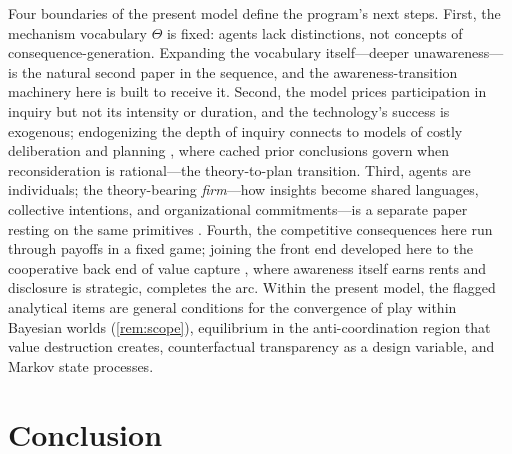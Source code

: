 \documentclass[11pt]{article}
\theoremstyle{definition}
\begin{document}
Four boundaries of the present model define the program's next steps.
First, the mechanism vocabulary $\Theta$ is fixed: agents lack distinctions, not concepts of consequence-generation.
Expanding the vocabulary itself---deeper unawareness---is the natural second paper in the sequence, and the awareness-transition machinery here is built to receive it.
Second, the model prices participation in inquiry but not its intensity or duration, and the technology's success is exogenous; endogenizing the depth of inquiry connects to models of costly deliberation and planning \citep{RyallAction2026}, where cached prior conclusions govern when reconsideration is rational---the theory-to-plan transition.
Third, agents are individuals; the theory-bearing \emph{firm}---how insights become shared languages, collective intentions, and organizational commitments---is a separate paper resting on the same primitives \citep{RyallWilkins2018}.
Fourth, the competitive consequences here run through payoffs in a fixed game; joining the front end developed here to the cooperative back end of value capture \citep{GansRyall2017,BryanRyallSchipper2022}, where awareness itself earns rents and disclosure is strategic, completes the arc.
Within the present model, the flagged analytical items are general conditions for the convergence of play within Bayesian worlds (\cref{rem:scope}), equilibrium in the anti-coordination region that value destruction creates, counterfactual transparency as a design variable, and Markov state processes.

\section{Conclusion}
\label{sec:conclusion}
\end{document}

